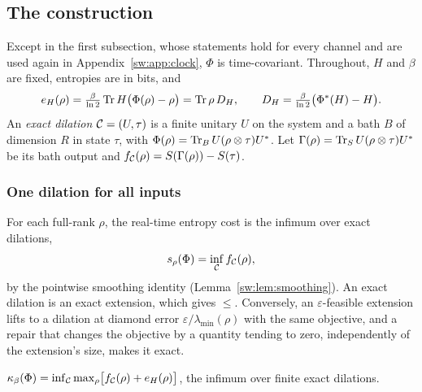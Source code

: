 \subsection{The construction}\label{sw:app:construction}

Except in the first subsection, whose statements hold for every channel and are used again in Appendix~\ref{sw:app:clock}, $\Phi$ is time-covariant. Throughout, $H$ and $\beta$ are fixed, entropies are in bits, and
\[
e_H(\rho)=\tfrac{\beta}{\ln2}\operatorname{Tr} H\bigl(\Phi(\rho)-\rho\bigr)=\operatorname{Tr}\rho\,D_H,\qquad D_H=\tfrac{\beta}{\ln2}\bigl(\Phi^*(H)-H\bigr).
\]
An \emph{exact dilation} $\mathcal C=(U,\tau)$ is a finite unitary $U$ on the system and a bath $B$ of dimension $R$ in state $\tau$, with $\Phi(\rho)=\operatorname{Tr}_BU(\rho\otimes\tau)U^*$. Let $\Gamma(\rho)=\operatorname{Tr}_SU(\rho\otimes\tau)U^*$ be its bath output and $f_{\mathcal C}(\rho)=S(\Gamma(\rho))-S(\tau)$.

\subsubsection{One dilation for all inputs}

For each full-rank $\rho$, the real-time entropy cost is the infimum over exact dilations,
\begin{equation}\label{sw:eq:pointwise}
s_\rho(\Phi)=\inf_{\mathcal C} f_{\mathcal C}(\rho),
\end{equation}
by the pointwise smoothing identity (Lemma~\ref{sw:lem:smoothing}). An exact dilation is an exact extension, which gives $\le$. Conversely, an $\varepsilon$-feasible extension lifts to a dilation at diamond error $\varepsilon/\lambda_{\min}(\rho)$ with the same objective, and a repair that changes the objective by a quantity tending to zero, independently of the extension's size, makes it exact.

\begin{lemma}[Minimax]\label{sw:lem:minimax}
$\kappa_\beta(\Phi)=\inf_{\mathcal C}\max_\rho\bigl[f_{\mathcal C}(\rho)+e_H(\rho)\bigr]$, the infimum over finite exact dilations.
\end{lemma}

